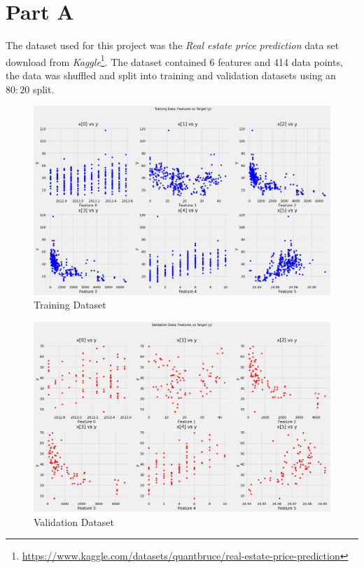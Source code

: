 \newpage
\section{Part A}
\label{sec:sec_a}
The dataset used for this project was the \textit{Real estate price prediction} data set download from \textit{Kaggle}\footnote{\url{https://www.kaggle.com/datasets/quantbruce/real-estate-price-prediction}}. The dataset contained 6 features and 414 data points, the data was shuffled and split into training and validation datasets using an $80:20$ split. 

\begin{figure}[htpb]
	\centering
	\includegraphics[width=\columnwidth]{figures/dataset_train.png}
	\caption{Training Dataset}
	\label{fig:dataset train}
\end{figure}

\begin{figure}[htpb]
	\centering
	\includegraphics[width=\columnwidth]{figures/dataset_val.png}
	\caption{Validation Dataset}
	\label{fig:dataset val}
\end{figure}
